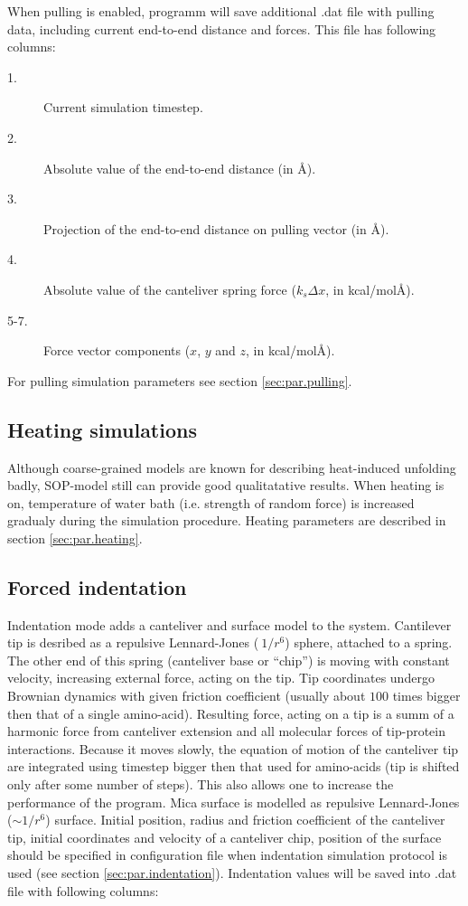 \documentclass[a4paper]{article}
\begin{document}
When pulling is enabled, programm will save additional .dat file with pulling data, including current end-to-end distance and forces. This file has following columns:

\begin{description}
\item[1.] Current simulation timestep.
\item[2.] Absolute value of the end-to-end distance (in \AA).
\item[3.] Projection of the end-to-end distance on pulling vector (in \AA).
\item[4.] Absolute value of the canteliver spring force ($k_s\Delta x$, in kcal/mol\AA).
\item[5-7.] Force vector components ($x$, $y$ and $z$, in kcal/mol\AA).
\end{description}

For pulling simulation parameters see section \ref{sec:par.pulling}.

\subsection{Heating simulations}
Although coarse-grained models are known for describing heat-induced unfolding badly, SOP-model still can provide good qualitatative results. When heating is on, temperature of water bath (i.e. strength of random force) is increased gradualy during the simulation procedure. Heating parameters are described in section \ref{sec:par.heating}.

\subsection{Forced indentation}
Indentation mode adds a canteliver and surface model to the system. Cantilever tip is desribed as a repulsive Lennard-Jones ($~1/r^6$) sphere, attached to a spring. The other end of this spring (canteliver base or ``chip'') is moving with constant velocity, increasing external force, acting on the tip. Tip coordinates undergo Brownian dynamics with given friction coefficient (usually about $100$ times bigger then that of a single amino-acid). Resulting force, acting on a tip is a summ of a harmonic force from canteliver extension and all molecular forces of tip-protein interactions. Because it moves slowly, the equation of motion of the canteliver tip are integrated using timestep bigger then that used for amino-acids (tip is shifted only after some number of steps). This also allows one to increase the performance of the program. Mica surface is modelled as repulsive Lennard-Jones ($\sim 1/r^6$) surface. Initial position, radius and friction coefficient of the canteliver tip, initial coordinates and 
velocity of a canteliver chip, position of the surface should be specified in configuration file when indentation simulation protocol is used (see section \ref{sec:par.indentation}). Indentation values will be saved into .dat file with following columns:
\end{document}
